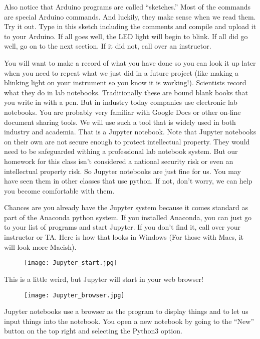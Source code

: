 Also notice that Arduino programs are called ``sketches.'' Most of the commands are special Arduino commands. And luckily, they make sense when we read them. Try it out. Type in this sketch including the comments and compile and upload it to your Arduino. If all goes well, the LED light will begin to blink. If all did go well, go on to the next section. If it did not, call over an instructor. 


You will want to make a record of what you have done so you can look it up later when you need to repeat what we just did in a future project (like making a blinking light on your instrument so you know it is working!).  Scientists record what they do in lab notebooks. Traditionally these are bound blank books that you write in with a pen.  But in industry today companies use electronic lab notebooks.  You are probably very familiar with Google Docs or other on-line document sharing tools.  We will use such a tool that is widely used in both industry and academia. That is a Jupyter notebook.  Note that Jupyter notebooks on their own are not secure enough to protect intellectual property. They would need to be safeguarded withing a professional lab notebook system.  But our homework for this class isn't considered a national security risk or even an intellectual property risk. So Jupyter notebooks are just fine for us. You may have seen them in other classes that use python.  If not, don't worry, we can help you become comfortable with them.  

Chances are you already have the Jupyter system because it comes standard as part of the Anaconda python system.  If you installed Anaconda, you can just go to your list of programs and start Jupyter. If you don't find it, call over your instructor or TA.  Here is how that looks in Windows (For those with Macs, it will look more Macish).

\begin{figure}[h!]
	\centering
	\texttt{[image: Jupyter\_start.jpg]}
\end{figure}

This is a little weird, but Jupyter will start in your web browser!  

\begin{figure}[h!]
	\centering
	\texttt{[image: Jupyter\_browser.jpg]}
\end{figure}

Jupyter notebooks use a browser as the program to display things and to let us input things into the notebook.  You open a new notebook by going to the ``New'' button on the top right and selecting the Python3 option.

